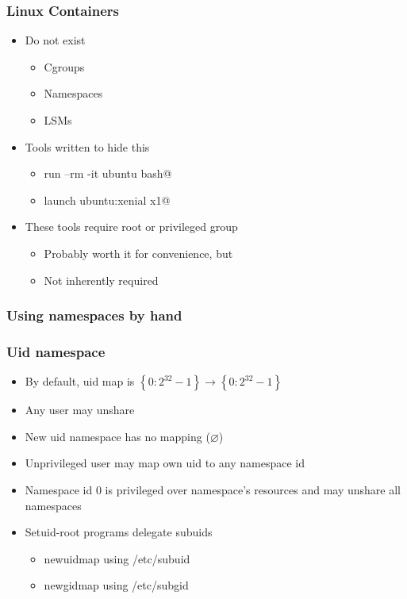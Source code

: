 \documentclass{beamer}
\begin{document}
\begin{frame}[fragile]
\frametitle{Linux Containers}
	\begin{itemize}
	\item Do not exist
		\begin{itemize}
		\item Cgroups
		\item Namespaces
		\item LSMs
		\end{itemize}
	\item Tools written to hide this
		\begin{itemize}
		\item \verb@docker run --rm -it ubuntu bash@
		\item \verb@lxc launch ubuntu:xenial x1@
		\end{itemize}
	\item These tools require root or privileged group
	\begin{itemize}

		\item Probably worth it for convenience, but
		\item Not inherently required
		\end{itemize}
	\end{itemize}
\end{frame}

\begin{frame}
\frametitle{Using namespaces by hand}
\begin{center}
\begin{figure}

\end{figure}
\end{center}
\end{frame}

\begin{frame}
\frametitle{Uid namespace}
	\begin{itemize}
	\item By default, uid map is $\left\{0:2^{32}-1\right\} \rightarrow \left\{ 0:2^{32}-1\right\}$
	\item Any user may unshare
	\item New uid namespace has no mapping ($\varnothing$)
	\item Unprivileged user may map own uid to any namespace id
	\item Namespace id 0 is privileged over namespace's resources and may unshare all namespaces
	\item Setuid-root programs delegate subuids
		\begin{itemize}
		\item newuidmap using /etc/subuid
		\item newgidmap using /etc/subgid
		\end{itemize}
	\end{itemize}
\end{frame}
\end{document}

